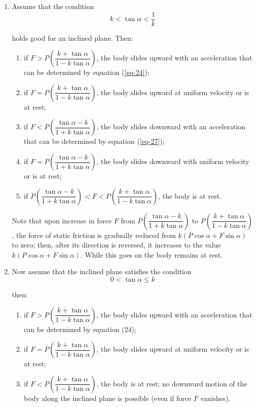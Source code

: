 \documentclass[a4paper,sfsidenotes]{tufte-book}
\begin{document}
\begin{enumerate}[label=\textbf{(\arabic*)},leftmargin=1cm]
\item Assume that the condition
\begin{equation*}
k < \tan \alpha < \frac{1}{k}
\end{equation*}

holds good for an inclined plane. Then:
\begin{enumerate}[label=\textbf{(\alph*)},leftmargin=1cm]
\item if $F>P \left(\dfrac{k+\tan \alpha}{ 1-k \tan \alpha}\right)$, the body slides upward with an acceleration that can be determined by equation (\ref{eq-24});
\item if $F=P \left(\dfrac{k+\tan \alpha}{ 1-k \tan \alpha}\right)$, the body slides upward at uniform velocity or is at rest;
\item if $F<P \left(\dfrac{\tan \alpha - k}{ 1+k \tan \alpha}\right)$, the body slides downward with an acceleration that can be determined by equation (\ref{eq-27});
\item if $F=P \left(\dfrac{\tan \alpha-k}{1+k \tan \alpha}\right)$, the body slides downward with uniform velocity or is at rest;
\item if $P\left( \dfrac{\tan \alpha-k}{1+k \tan \alpha}\right) < F < P \left( \dfrac{k+\tan \alpha}{1-k \tan \alpha} \right)$, the body is at rest.
\end{enumerate}

Note that upon increase in force $F$ from $P \left(\dfrac{\tan \alpha-k}{1 +k \tan \alpha}\right)$ to $P \left( \dfrac{k+\tan \alpha} {1-k \tan \alpha} \right)$, the force of static friction is gradually reduced from $k (P \cos \alpha +F \sin \alpha)$ to zero; then, after its direction is reversed, it increases to the value $k (P \cos \alpha +F \sin \alpha)$. While this goes on the body remains at rest.
	 
\item Now assume that the inclined plane satisfies the condition
\begin{equation*}
0 < \tan \alpha \leqslant k
\end{equation*}

then:

\begin{enumerate}[label=\textbf{(\alph*)},leftmargin=1cm]
\item if $F>P \left(\dfrac{k+\tan \alpha}{ 1-k \tan \alpha}\right)$, the body slides upward with an acceleration that can be determined by equation (24);
\item if  $F=P \left(\dfrac{k+\tan \alpha}{ 1-k \tan \alpha}\right)$, the body slides upward at uniform velocity or is at rest;
\item if  $F<P \left(\dfrac{k+\tan \alpha}{ 1-k \tan \alpha}\right)$, the body is at rest; no downward motion of the body along the inclined plane is possible (even if force $F$ vanishes).
\end{enumerate}


\end{enumerate}
\end{document}

